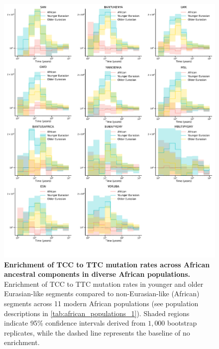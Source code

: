 \begin{figure}
    \centering
    \includegraphics[width=\textwidth]{figures/gb_bta/gb_real_bta_9.pdf}
    \caption{\textbf{Enrichment of TCC to TTC mutation rates across African ancestral components in diverse African populations.} Enrichment of TCC to TTC mutation rates in younger and older Eurasian-like segments compared to non-Eurasian-like (African) segments across 11 modern African populations (see population descriptions in \ref{tab:african_populations_1}). Shaded regions indicate 95\% confidence intervals derived from $1{,}000$ bootstrap replicates, while the dashed line represents the baseline of no enrichment.
    }
    \label{fig:gb-mut-tcc-pops}
\end{figure}

